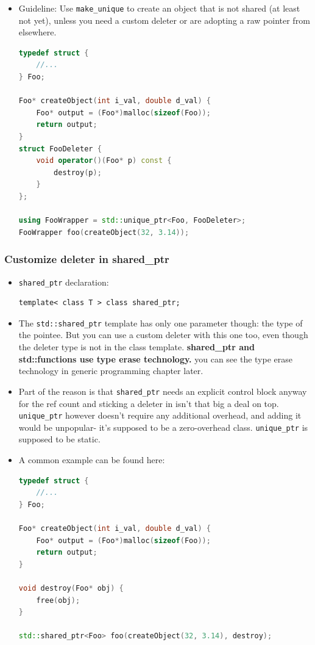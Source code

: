 \documentclass[a4paper,11pt,twoside]{book}
\begin{document}
\begin{itemize}
	\item Guideline: Use \texttt{make\_unique} to create an object that is not shared (at least not yet), unless you need a custom deleter or are adopting a raw pointer from elsewhere.
	
\begin{lstlisting}[frame=single, language=c++]
typedef struct {
	//...
} Foo;

Foo* createObject(int i_val, double d_val) {
	Foo* output = (Foo*)malloc(sizeof(Foo));
	return output;
}
struct FooDeleter {
	void operator()(Foo* p) const {
		destroy(p);
	}
};
	
using FooWrapper = std::unique_ptr<Foo, FooDeleter>;
FooWrapper foo(createObject(32, 3.14));
\end{lstlisting}


\end{itemize}

\subsubsection{Customize deleter in shared\_ptr}
\begin{itemize}
	\item \texttt{shared\_ptr} declaration:
\begin{lstlisting}
template< class T > class shared_ptr;
\end{lstlisting}
	\item The \texttt{std::shared\_ptr} template has only one parameter though: the type of the pointee. But you can use a custom deleter with this one too, even though the deleter type is not in the class template. \textbf{shared\_ptr and std::functions use type erase technology.} you can see the type erase technology in generic programming chapter later.
	
	\item Part of the reason is that \texttt{shared\_ptr} needs an explicit control block anyway for the ref count and sticking a deleter in isn't that big a deal on top. \texttt{unique\_ptr} however doesn't require any additional overhead, and adding it would be unpopular- it's supposed to be a zero-overhead class. \texttt{unique\_ptr} is supposed to be static.
	
	\item A common example can be found here:
\begin{lstlisting}[frame=single, language=c++]
typedef struct {
	//...
} Foo;

Foo* createObject(int i_val, double d_val) {
	Foo* output = (Foo*)malloc(sizeof(Foo));
	return output;
}

void destroy(Foo* obj) {
	free(obj);
}

std::shared_ptr<Foo> foo(createObject(32, 3.14), destroy);
\end{lstlisting}
\end{itemize}
\end{document}
